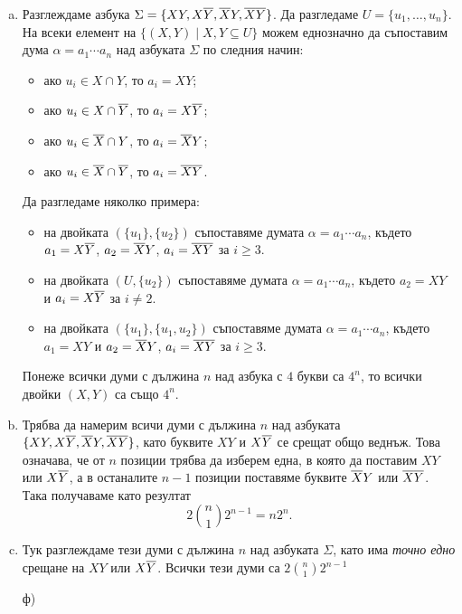 \begin{solution}
  \begin{enumerate}[a)]
  \item 
    Разглеждаме азбука $\Sigma = \{XY, X\overline{Y}, \overline{X}Y, \overline{X}\overline{Y}\}$.
    Да разгледаме $U = \{u_1,\dots,u_n\}$.
    На всеки елемент на  $\{(X,Y) \mid X,Y \subseteq U\}$ можем еднозначно да съпоставим 
    дума  $\alpha = a_1\cdots a_n$ над азбуката $\Sigma$
    по следния начин:
    \begin{itemize}
    \item 
      ако $u_i \in X \cap Y$, то $a_i = XY$;
    \item 
      ако $u_i \in X \cap  \overline{Y}$, то $a_i = X\overline{Y}$;
    \item 
      ако $u_i \in \overline{X} \cap Y$, то $a_i = \overline{X}Y$;
    \item 
      ако $u_i \in \overline{X} \cap \overline{Y}$, то $a_i = \overline{X}\overline{Y}$.
    \end{itemize}
    Да разгледаме няколко примера:
    \begin{itemize}
    \item
      на двойката $(\{u_1\},\{u_2\})$ съпоставяме думата $\alpha = a_1\cdots a_n$,
      където $a_1 = X\overline{Y}$, $a_2 = \overline{X}Y$, $a_i = \overline{X}\overline{Y}$ за $i \geq 3$.
    \item 
      на двойката $(U,\{u_2\})$ съпоставяме думата $\alpha = a_1\cdots a_n$,
      където $a_2 = XY$ и $a_i = X\overline{Y}$ за $i \neq 2$.
    \item
      на двойката $(\{u_1\},\{u_1,u_2\})$ съпоставяме думата $\alpha = a_1\cdots a_n$,
      където $a_1 = XY$ и $a_2 = \overline{X}Y$, $a_i = \overline{X}\overline{Y}$ за $i \geq 3$.
    \end{itemize}
    Понеже всички думи с дължина $n$ над азбука с $4$ букви са $4^n$, 
    то всички двойки $(X,Y)$ са също $4^n$.
  \item
    Трябва да намерим всичи думи с дължина $n$ над азбуката $\{XY,X\overline{Y},\overline{X}Y,\overline{X}\overline{Y}\}$,
    като буквите $XY$ и $X\overline{Y}$ се срещат общо веднъж.
    Това означава, че от $n$ позиции трябва да изберем една, в която да поставим $XY$ или $X\overline{Y}$,
    а в останалите $n-1$ позиции поставяме буквите $\overline{X}Y$ или $\overline{X}\overline{Y}$.
    Така получаваме като резултат \[2\binom{n}{1}2^{n-1} = n2^n.\]
  \item
    Тук разглеждаме тези думи с дължина $n$ над азбуката $\Sigma$, като
    има {\em точно едно} срещане на $XY$ или $X\overline{Y}$.
    Всички тези думи са $2\binom{n}{1}2^{n-1}$
  \item[ф)]

\end{enumerate}
\end{solution}
